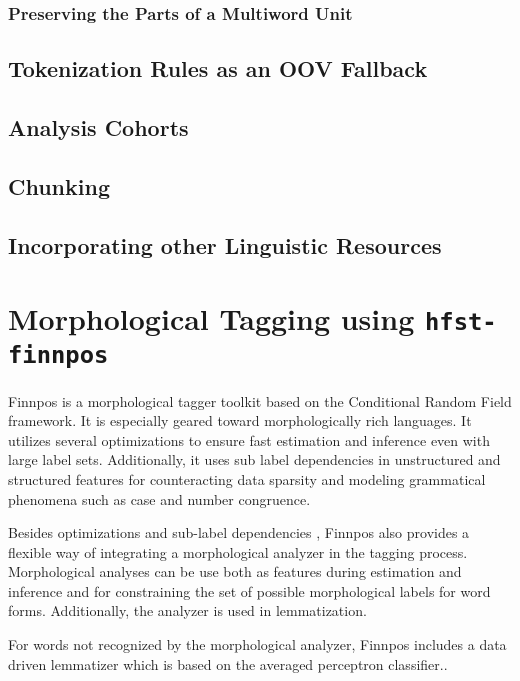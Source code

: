 \documentclass{llncs}
\begin{document}
\subsubsection{Preserving the Parts of a Multiword Unit}

\subsection{Tokenization Rules as an OOV Fallback}

\subsection{Analysis Cohorts}

\subsection{Chunking}

\subsection{Incorporating other Linguistic Resources}

\section{Morphological Tagging using {\tt hfst-finnpos}}\label{sec:morph-tagging}

Finnpos \cite{silfverberg2015} is a morphological tagger toolkit based
on the Conditional Random Field framework. It is especially geared
toward morphologically rich languages.  It utilizes several
optimizations to ensure fast estimation and inference even with large
label sets. Additionally, it uses sub label dependencies in
unstructured and structured features for counteracting data sparsity
and modeling grammatical phenomena such as case and number congruence.

Besides optimizations and sub-label dependencies
\cite{silfverberg2014}, Finnpos also provides a flexible way of
integrating a morphological analyzer in the tagging
process. Morphological analyses can be use both as features during
estimation and inference and for constraining the set of possible
morphological labels for word forms. Additionally, the analyzer is
used in lemmatization.

For words not recognized by the morphological analyzer, Finnpos
includes a data driven lemmatizer which is based on the averaged
perceptron classifier..
\end{document}
